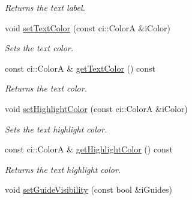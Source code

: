 \begin{DoxyCompactItemize}
\begin{DoxyCompactList}\small\item\em Returns the text label. \end{DoxyCompactList}\item 
\hypertarget{class_ui_text_a302580c9e71621e75a462d8e4df8d81b}{void \hyperlink{class_ui_text_a302580c9e71621e75a462d8e4df8d81b}{set\-Text\-Color} (const ci\-::\-Color\-A \&i\-Color)}\label{class_ui_text_a302580c9e71621e75a462d8e4df8d81b}

\begin{DoxyCompactList}\small\item\em Sets the text color. \end{DoxyCompactList}\item 
\hypertarget{class_ui_text_abe868976ebad4e255868745ba84481bb}{const ci\-::\-Color\-A \& \hyperlink{class_ui_text_abe868976ebad4e255868745ba84481bb}{get\-Text\-Color} () const }\label{class_ui_text_abe868976ebad4e255868745ba84481bb}

\begin{DoxyCompactList}\small\item\em Returns the text color. \end{DoxyCompactList}\item 
\hypertarget{class_ui_text_a56214eb2aab72421098716c5ae40f934}{void \hyperlink{class_ui_text_a56214eb2aab72421098716c5ae40f934}{set\-Highlight\-Color} (const ci\-::\-Color\-A \&i\-Color)}\label{class_ui_text_a56214eb2aab72421098716c5ae40f934}

\begin{DoxyCompactList}\small\item\em Sets the text highlight color. \end{DoxyCompactList}\item 
\hypertarget{class_ui_text_a93a08d92316328da2d94e6df9b485133}{const ci\-::\-Color\-A \& \hyperlink{class_ui_text_a93a08d92316328da2d94e6df9b485133}{get\-Highlight\-Color} () const }\label{class_ui_text_a93a08d92316328da2d94e6df9b485133}

\begin{DoxyCompactList}\small\item\em Returns the text highlight color. \end{DoxyCompactList}\item 
\hypertarget{class_ui_text_aaee26dc701b007d6a2cd572fa21b45ee}{void \hyperlink{class_ui_text_aaee26dc701b007d6a2cd572fa21b45ee}{set\-Guide\-Visibility} (const bool \&i\-Guides)}\label{class_ui_text_aaee26dc701b007d6a2cd572fa21b45ee}


\end{DoxyCompactItemize}
